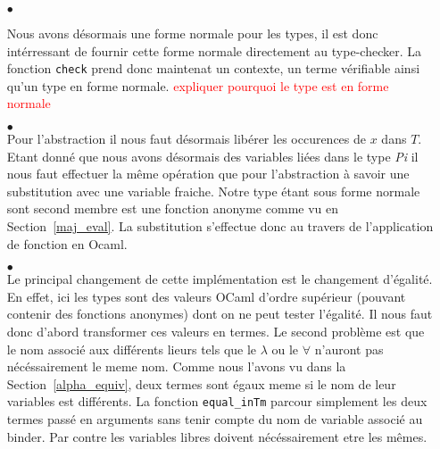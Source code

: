 \documentclass {article}
\newcommand{\codefrom}[3]
           {}
\theoremstyle{definition}
\theoremstyle{remark}
\newcommand{\todo}[1]{\textcolor{red}{#1}}
\newcommand{\fun}[1]{\lstinline!#1!}
\begin{document}
\begin{itemize}
\item[$\bullet$]

Nous avons désormais une forme normale pour les types, il est donc intérressant de 
fournir cette forme normale directement au type-checker. La fonction \fun{check} prend donc maintenat
un contexte, un terme vérifiable ainsi qu'un type en forme normale. \todo{expliquer pourquoi le type est en forme normale}

  \codefrom{dependent}{lambda}{check_head}

\item[$\bullet$] \\

  Pour l'abstraction il nous faut désormais libérer les occurences de $x$ dans $T$.
  Etant donné que nous avons désormais des variables liées dans le type \emph{Pi} il nous faut
  effectuer la même opération que pour l'abstraction à savoir une substitution avec une variable
  fraiche. Notre type étant sous forme normale sont second membre est une fonction
  anonyme comme vu en Section~\ref{maj_eval}. La substitution s'effectue donc au travers de l'application de fonction en Ocaml.

  \codefrom{dependent}{lambda}{check_abs}
  
\item[$\bullet$] \\
  
  Le principal changement de cette implémentation est le changement d'égalité. 
  En effet, ici les types sont des valeurs OCaml d'ordre supérieur (pouvant contenir des fonctions anonymes) dont on ne peut 
  tester l'égalité. Il nous faut donc d'abord transformer 
  ces valeurs en termes. Le second problème est que le nom associé 
  aux différents lieurs tels que le $\lambda$ ou le $\forall$ n'auront pas nécéssairement le 
  meme nom. Comme nous l'avons vu dans la Section~\ref{alpha_equiv},
  deux termes sont égaux meme si le nom de leur variables est différents. 
  La fonction \fun{equal_inTm} parcour simplement les deux termes passé en arguments sans tenir compte
  du nom de variable associé au binder. Par contre les variables libres doivent nécéssairement etre les mêmes.

  \codefrom{dependent}{lambda}{check_inv}


\end{itemize}
\end{document}
